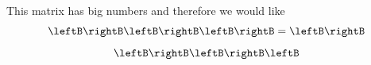 \begin{solution} This matrix has big numbers and therefore we would like
%
\begin{equation*}
\leftB
\begin{array}{rrr}
\end{array}
\rightB \leftB
\begin{array}{rrr}
\end{array}
\rightB \leftB
\begin{array}{rrr}
\end{array}
\rightB =\leftB
\begin{array}{rrr}
\end{array}
\rightB
\end{equation*}
%
\begin{equation}
\leftB
\begin{array}{rrr}
\end{array}
\rightB \leftB
\begin{array}{rrr}
\end{array} 
\rightB \leftB
\begin{array}{rrr}
\end{array}

\end{equation}
\end{solution}
